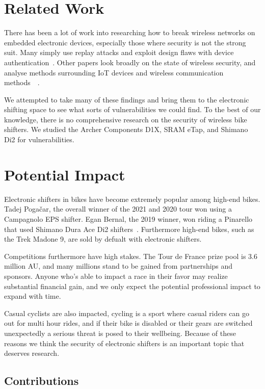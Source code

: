 \documentclass[letterpaper,twocolumn,10pt]{article}
\begin{document}
\section{Related Work}

There has been a lot of work into researching how to break wireless networks on embedded electronic devices, especially those where security is not the strong suit. Many simply use replay attacks and exploit design flaws with device authentication~\cite{Halperin}. Other papers look broadly on the state of wireless security, and analyse methods surrounding IoT devices and wireless communication methods~\cite{Choi}~\cite{Radek}.

We attempted to take many of these findings and bring them to the electronic shifting space to see what sorts of vulnerabilities we could find. To the best of our knowledge, there is no comprehensive research on the security of wireless bike shifters. We studied the Archer Components D1X, SRAM eTap, and Shimano Di2 for vulnerabilities.

\section{Potential Impact}

Electronic shifters in bikes have become extremely popular among high-end bikes. Tadej Pogačar, the overall winner of the 2021 and 2020 tour won using a Campagnolo EPS shifter. Egan Bernal, the 2019 winner, won riding a Pinarello that used Shimano Dura Ace Di2 shifters~\cite{GCNTech}. Furthermore high-end bikes, such as the Trek Madone 9, are sold by defualt with electronic shifters.

Competitions furthermore have high stakes. The Tour de France prize pool is 3.6 million AU, and many millions stand to be gained from partnerships and sponsors. Anyone who's able to impact a race in their favor may realize substantial financial gain, and we only expect the potential professional impact to expand with time.

Casual cyclists are also impacted, cycling is a sport where casual riders can go out for multi hour rides, and if their bike is disabled or their gears are switched unexpectedly a serious threat is posed to their wellbeing. Because of these reasons we think the security of electronic shifters is an important topic that deserves research.

\subsection{Contributions}
\end{document}
